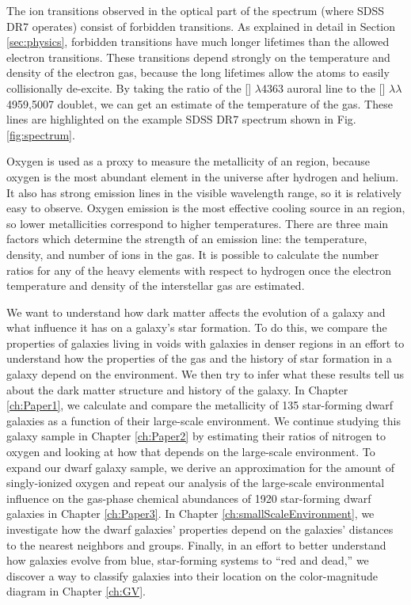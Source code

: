 The ion transitions observed in the optical part of the spectrum (where SDSS DR7 
operates) consist of forbidden transitions.  As explained in detail in Section 
\ref{sec:physics}, forbidden transitions have much longer lifetimes than the 
allowed electron transitions.  These transitions depend strongly on the 
temperature and density of the electron gas, because the long lifetimes allow 
the atoms to easily collisionally de-excite.  By taking the ratio of the 
[] $\lambda$4363 auroral line to the [] 
$\lambda \lambda$4959,5007 doublet, we can get an estimate of the temperature of 
the gas.  These lines are highlighted on the example SDSS DR7 spectrum shown in 
Fig. \ref{fig:spectrum}.  

Oxygen is used as a proxy to measure the metallicity of an  region, 
because oxygen is the most abundant element in the universe after hydrogen and 
helium.  It also has strong emission lines in the visible wavelength range, so 
it is relatively easy to observe.  Oxygen emission is the most effective cooling 
source in an  region, so lower metallicities correspond to higher 
temperatures.  There are three main factors which determine the strength of an 
emission line: the temperature, density, and number of ions in the gas.  It is 
possible to calculate the number ratios for any of the heavy elements with 
respect to hydrogen once the electron temperature and density of the 
interstellar gas are estimated.


We want to understand how dark matter affects the evolution of a galaxy and what 
influence it has on a galaxy's star formation.  To do this, we compare the 
properties of galaxies living in voids with galaxies in denser regions in an 
effort to understand how the properties of the gas and the history of star 
formation in a galaxy depend on the environment.  We then try to infer what 
these results tell us about the dark matter structure and history of the galaxy.  
In Chapter \ref{ch:Paper1}, we calculate and compare the metallicity of 135 
star-forming dwarf galaxies as a function of their large-scale environment.  We 
continue studying this galaxy sample in Chapter \ref{ch:Paper2} by estimating 
their ratios of nitrogen to oxygen and looking at how that depends on the 
large-scale environment.  To expand our dwarf galaxy sample, we derive an 
approximation for the amount of singly-ionized oxygen and repeat our analysis of 
the large-scale environmental influence on the gas-phase chemical abundances of 
1920 star-forming dwarf galaxies in Chapter \ref{ch:Paper3}.  In Chapter 
\ref{ch:smallScaleEnvironment}, we investigate how the dwarf galaxies' 
properties depend on the galaxies' distances to the nearest neighbors and 
groups.  Finally, in an effort to better understand how galaxies evolve from 
blue, star-forming systems to ``red and dead,'' we discover a way to classify 
galaxies into their location on the color-magnitude diagram in Chapter 
\ref{ch:GV}.